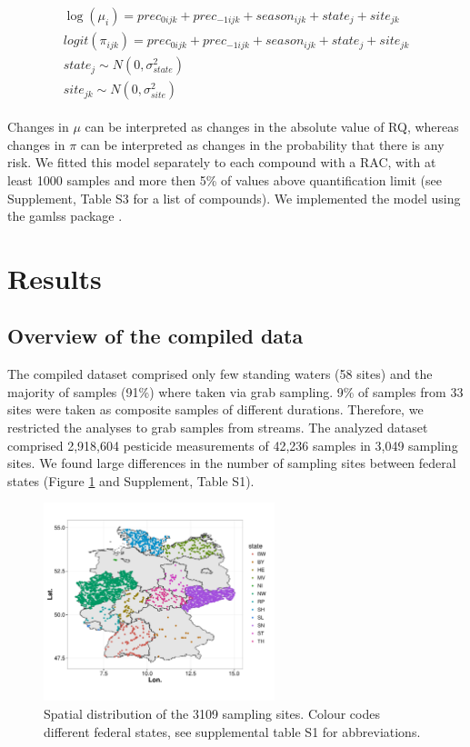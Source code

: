 \documentclass[journal=esthag,manuscript=article]{achemso}
\begin{document}
\begin{align}
\begin{split}
\log(\mu_i) = prec_{0 ijk} + prec_{-1 ijk} + season_{ijk} + state_j + site_{jk}\\
logit(\pi_{ijk}) = prec_{0 ijk} + prec_{-1 ijk} + season_{ijk} + state_j + site_{jk}\\
state_{j} \sim N(0, \sigma^2_{state}) \\
site_{jk} \sim N(0, \sigma^2_{site})
\end{split}
\label{eqn:eqn4}
\end{align}

Changes in $\mu$ can be interpreted as changes in the absolute value of RQ, whereas changes in $\pi$ can be interpreted as changes in the probability that there is any risk.
We fitted this model separately to each compound with a RAC, with at least 1000 samples and more then 5\% of values above quantification limit (see Supplement, Table S3 for a list of compounds). 
We implemented the model using the gamlss package \cite{stasinopoulos_generalized_2007}.




\section{Results}
\subsection{Overview of the compiled data}

The compiled dataset comprised only few standing waters (58 sites) and the majority of samples (91\%) where taken via grab sampling.  %
9\% of samples from 33 sites were taken as composite samples of different durations.
Therefore, we restricted the analyses to grab samples from streams. 
The analyzed dataset comprised 2,918,604 pesticide measurements of 42,236 samples in 3,049 sampling sites.  %
We found large differences in the number of sampling sites between federal states (Figure \ref{fig:fig1} and Supplement, Table S1).

\begin{figure}[ht]
  \includegraphics[width=0.6\textwidth]{figure1.pdf}
  \caption{Spatial distribution of the 3109 sampling sites. Colour codes different federal states, see supplemental table S1 for abbreviations.}
  \label{fig:fig1}
\end{figure}
\end{document}
